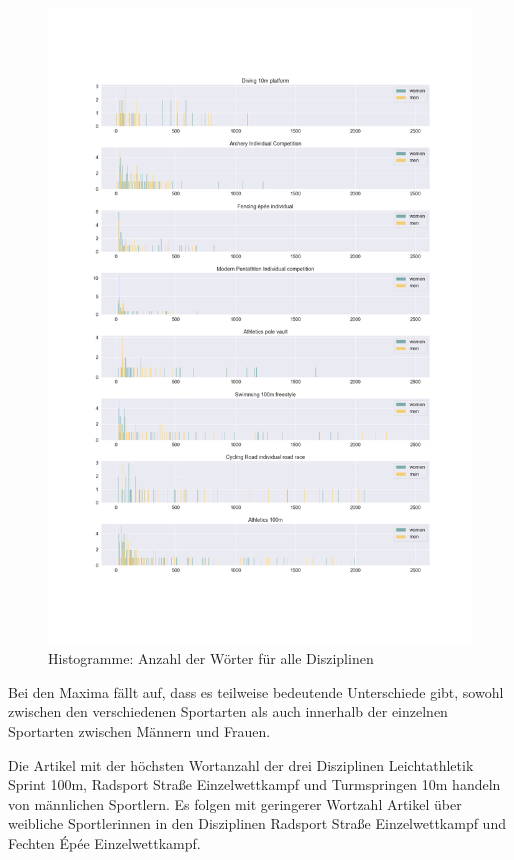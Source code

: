 \documentclass[11pt]{article}
\begin{document}
\begin{figure}
\caption{Histogramme: Anzahl der Wörter für alle Disziplinen}
\includegraphics[width=1\textwidth]{figures/wordcount_disciplines_histogram.png}
\end{figure}

Bei den Maxima fällt auf, dass es teilweise bedeutende Unterschiede gibt, sowohl zwischen den verschiedenen Sportarten als auch innerhalb der einzelnen Sportarten zwischen Männern und Frauen. 

Die Artikel mit der höchsten Wortanzahl der drei Disziplinen Leichtathletik Sprint 100m, Radsport Straße Einzelwettkampf und Turmspringen 10m handeln von männlichen Sportlern. Es folgen mit geringerer Wortzahl Artikel über weibliche Sportlerinnen in den Disziplinen Radsport Straße Einzelwettkampf und Fechten Épée Einzelwettkampf. 
\end{document}
